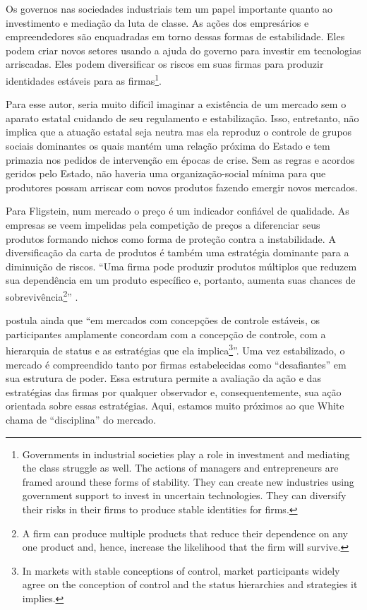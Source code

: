 \documentclass[a4paper, 12pt, openright, oneside, german, french, english, brazil]{abntex2}
\begin{document}
	\begin{citacao}
		Os governos nas sociedades industriais tem um papel importante quanto ao investimento e mediação da luta de classe. As ações dos empresários e empreendedores são enquadradas em torno dessas formas de estabilidade. Eles podem criar novos setores usando a ajuda do governo para investir em tecnologias arriscadas. Eles podem diversificar os riscos em suas firmas para produzir identidades estáveis para as firmas\footnote{Governments in industrial societies play a role in investment and mediating the class struggle as well. The actions of managers and entrepreneurs are framed around these forms of stability. They can create new industries using government support to invest in uncertain technologies. They can diversify their risks in their firms to produce stable identities for firms.}. \cite[p. 62]{fligstein2002architecture}
	\end{citacao}

	Para esse autor, seria muito difícil imaginar a existência de um mercado sem o aparato estatal cuidando de seu regulamento e estabilização. Isso, entretanto, não implica que a atuação estatal seja neutra mas ela reproduz o controle de grupos sociais dominantes os quais mantém uma relação próxima do Estado e tem primazia nos pedidos de intervenção em épocas de crise. Sem as regras e acordos geridos pelo Estado, não haveria uma organização-social mínima para que produtores possam arriscar com novos produtos fazendo emergir novos mercados.

	Para Fligstein, num mercado o preço é um indicador confiável de qualidade. As empresas se veem impelidas pela competição de preços a diferenciar seus produtos formando nichos como forma de proteção contra a instabilidade. A diversificação da carta de produtos é também uma estratégia dominante para a diminuição de riscos. ``Uma firma pode produzir produtos múltiplos que reduzem sua dependência em um produto específico e, portanto, aumenta suas chances de sobrevivência\footnote{A firm can produce multiple products that reduce their dependence on any one product and, hence, increase the likelihood that the firm will survive.}'' .

	 postula ainda que ``em mercados com concepções de controle estáveis, os participantes amplamente concordam com a concepção de controle, com a hierarquia de status e as estratégias que ela implica\footnote{In markets with stable conceptions of control, market participants widely agree on the conception of control and the status hierarchies and strategies it implies.}''. Uma vez estabilizado, o mercado é compreendido tanto por firmas estabelecidas como ``desafiantes'' em sua estrutura de poder. Essa estrutura permite a avaliação da ação e das estratégias das firmas por qualquer observador e, consequentemente, sua ação orientada sobre essas estratégias. Aqui, estamos muito próximos ao que White chama de ``disciplina'' do mercado.
\end{document}
